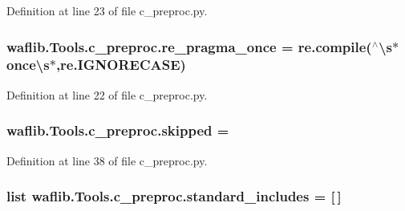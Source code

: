 Definition at line 23 of file c\+\_\+preproc.\+py.

\subsubsection[{\texorpdfstring{re\+\_\+pragma\+\_\+once}{re_pragma_once}}]{\setlength{\rightskip}{0pt plus 5cm}waflib.\+Tools.\+c\+\_\+preproc.\+re\+\_\+pragma\+\_\+once = re.\+compile(\textquotesingle{}$^\wedge$\textbackslash{}{\bf s}$\ast${\bf once\textbackslash{}s}$\ast$\textquotesingle{},re.\+I\+G\+N\+O\+R\+E\+C\+A\+SE)}\hypertarget{namespacewaflib_1_1_tools_1_1c__preproc_aaa8276cc9c2d789f306f5988311f65ca}{}\label{namespacewaflib_1_1_tools_1_1c__preproc_aaa8276cc9c2d789f306f5988311f65ca}


Definition at line 22 of file c\+\_\+preproc.\+py.

\subsubsection[{\texorpdfstring{skipped}{skipped}}]{ waflib.\+Tools.\+c\+\_\+preproc.\+skipped = \textquotesingle{}}\hypertarget{namespacewaflib_1_1_tools_1_1c__preproc_a631381b6890985ef083f6544eedbd3e1}{}\label{namespacewaflib_1_1_tools_1_1c__preproc_a631381b6890985ef083f6544eedbd3e1}


Definition at line 38 of file c\+\_\+preproc.\+py.

\subsubsection[{\texorpdfstring{standard\+\_\+includes}{standard_includes}}]{\setlength{\rightskip}{0pt plus 5cm}list waflib.\+Tools.\+c\+\_\+preproc.\+standard\+\_\+includes = \mbox{[}$\,$\mbox{]}}\hypertarget{namespacewaflib_1_1_tools_1_1c__preproc_ab5ab2241e9fcbb11a870c209ef58871c}{}\label{namespacewaflib_1_1_tools_1_1c__preproc_ab5ab2241e9fcbb11a870c209ef58871c}


